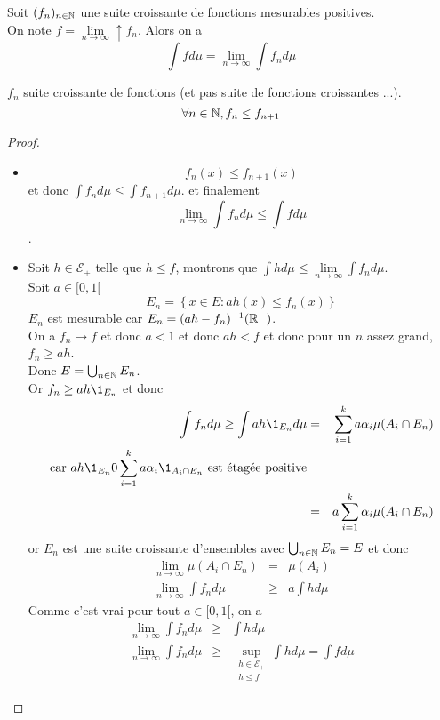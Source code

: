 \begin{theorem} \label{thm:convergence_monotone}
	Soit $(f_n)_{n \in \mathbb{N}}$ une suite croissante de fonctions mesurables positives.\\
	On note $f = \lim\limits_{n \to \infty}\uparrow f_n$.
	Alors on a
	$$ \int f d\mu = \lim\limits_{n \to \infty} \int f_n d\mu $$
\end{theorem}

\begin{remarque}
	$f_n$ suite croissante de fonctions (et pas suite de fonctions croissantes ...).
	$$ \forall n \in \mathbb{N}, f_n \leq f_{n+1} $$
\end{remarque}


\begin{proof}
	\begin{itemize}
		\item $$f_n (x) \leq f_{n+1}(x)$$ et donc $\int f_n d\mu \leq \int f_{n+1} d\mu$.
		      et finalement $$\lim\limits_{n \to \infty} \int f_n d\mu \leq \int f d\mu$$.
		\item Soit $h \in \mathcal{E}_+$ telle que $h \leq f$, montrons que $\int h d\mu \leq \lim\limits_{n \to \infty} \int f_n d\mu$.\\
		      Soit $a \in [0,1[$
		      $$ E_n = \left\{ x \in E :  ah(x) \leq f_n(x) \right\} $$
		      $E_n$ est mesurable car $E_n = (ah-f_n)^{-1}(\mathbb{R}^-)$.\\
		      On a $f_n \to f$ et donc $a < 1$ et donc $ah < f$ et donc pour un
		      $n$ assez grand, $f_n \geq ah$.\\
		      Donc $E = \bigcup_{n \in \mathbb{N}} E_n$.\\
		      Or $ f_n \geq ah \1_{E_n} $ et donc
		      \begin{eqnarray*}
			      \int f_n d\mu \geq \int ah \1_{E_n} d\mu &=& \sum_{i=1}^k a \alpha_i \mu (A_i \cap E_n) \\
			      \text{car} \ ah\1_{E_n} 0 \sum_{i=1}^k a \alpha_i \1_{A_i \cap E_n} \  \text{est étagée positive}& \\
			      &=& a \sum_{i=1}^k \alpha_i \mu(A_i \cap E_n) \\
		      \end{eqnarray*}
		      or $E_n$ est une suite croissante d'ensembles avec $\bigcup_{n \in \mathbb{N}} E_n = E$ et donc
		      \begin{eqnarray*}
			      \lim\limits_{n \to \infty} \mu(A_i \cap E_n) &=& \mu(A_i)\\
			      \lim \limits_{n \to \infty} \int f_n d\mu &\geq& a \int h d\mu
		      \end{eqnarray*}
		      Comme c'est vrai pour tout $a \in [0,1[$, on a
		      \begin{eqnarray*}
			      \lim \limits_{n \to \infty} \int f_n d\mu &\geq&  \int h d\mu\\
			      \lim \limits_{n \to \infty} \int f_n d\mu &\geq& \sup\limits_{\substack{h \in \mathcal{E}_+ \\ h \leq f}} \int h d\mu = \int f d\mu
		      \end{eqnarray*}
	\end{itemize}
\end{proof}


